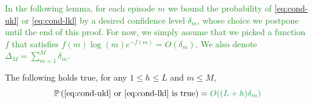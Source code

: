 \documentclass[runningheads, envcountsame, a4paper]{llncs}
\newcommand{\diff}[1]{\textcolor{ForestGreen}{#1}}
\begin{document}
\diff{In the following lemma, for each episode $m$ we bound the probability of \eqref{eq:cond-ukl} or \eqref{eq:cond-lkl} by a desired confidence level $\delta_m$, whose choice we postpone until the end of this proof. For now, we simply assume that we picked a function $f$ that satisfies $f(m)\log (m) e^{-f(m)} = O(\delta_m)$. We also denote $\Delta_M = \sum_{m=1}^{M}\delta_m$.}

\begin{lemma}
\label{lemma:boundary-crossing-prob}
The following holds true, for any $1 \leq h \leq L$ and $m \leq M$,
\begin{equation*}
    \probability{\text{\eqref{eq:cond-ukl} or \eqref{eq:cond-lkl} is true}} = \diff{O((L+h)\delta_m)}
\end{equation*}
\end{lemma}
\end{document}
